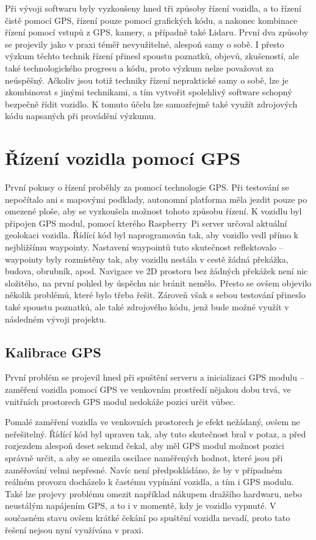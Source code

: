 \documentclass[czech, bachelor]{diploma}
\begin{document}
Při vývoji softwaru byly vyzkoušeny hned tři způsoby řízení vozidla, a to řízení čistě pomocí GPS, řízení pouze pomocí grafických
kódu, a nakonec kombinace řízení pomocí vstupů z GPS, kamery, a případně také Lidaru. První dva způsoby se projevily jako v praxi
téměř nevyužitelné, alespoň samy o sobě. I přesto výzkum těchto technik řízení přinesl spoustu poznatků, objevů, zkušeností, ale
také technologického progresu a kódu, proto výzkum nelze považovat za neúspěšný. Ačkoliv jsou totiž techniky řízení nepraktické
samy o sobě, lze je zkombinovat s jinými technikami, a tím vytvořit spolehlivý software schopný bezpečně řídit vozidlo. K tomuto
účelu lze samozřejmě také využít zdrojových kódu napsaných při provádění výzkumu.

\section{Řízení vozidla pomocí GPS} \label{gps-failure}

První pokusy o řízení proběhly za pomocí technologie GPS. Při testování se nepočítalo ani s mapovými podklady, autonomní platforma
měla jezdit pouze po omezené ploše, aby se vyzkoušela možnost tohoto způsobu řízení. K vozidlu byl připojen GPS modul, pomocí
kterého Raspberry~Pi server určoval aktuální geolokaci vozidla. Řídící kód byl naprogramován tak, aby vozidlo vedl přímo
k nejbližšímu waypointy. Nastavení waypointů tuto skutečnost reflektovalo -- waypointy byly rozmístěny tak, aby vozidlu nestála
v cestě žádná překážka, budova, obrubník, apod. Navigace ve 2D prostoru bez žádných překážek není nic složitého, na první pohled
by úspěchu nic bránit nemělo. Přesto se ovšem objevilo několik problémů, které bylo třeba řešit. Zároveň však s sebou testování
přineslo také spoustu poznatků, ale také zdrojového kódu, jenž bude možné využít v následném vývoji projektu.

\subsection{Kalibrace GPS}

První problém se projevil hned při spuštění serveru a inicializaci GPS modulu -- zaměření vozidla pomocí GPS ve venkovním
prostředí nějakou dobu trvá, ve vnitřních prostorech GPS modul nedokáže pozici určit vůbec.

Pomalé zaměření vozidla ve venkovních prostorech je efekt nežádaný, ovšem ne neřešitelný. Řídící kód byl upraven tak, aby tuto
skutečnost bral v potaz, a před rozjezdem alespoň deset sekund čekal, aby měl GPS modul možnost pozici správně určit, a aby se
omezila oscilace naměřených hodnot, které jsou při zaměřování velmi nepřesné. Navíc není předpokládáno, že by v případném reálném
provozu docházelo k častému vypínání vozidla, a tím i GPS modulu. Také lze projevy problému omezit například nákupem dražšího
hardwaru, nebo neustálým napájením GPS, a to i v momentě, kdy je vozidlo vypnuté. V současném stavu ovšem krátké čekání
po spuštění vozidla nevadí, proto tato řešení nejsou nyní využívána v praxi.
\end{document}
